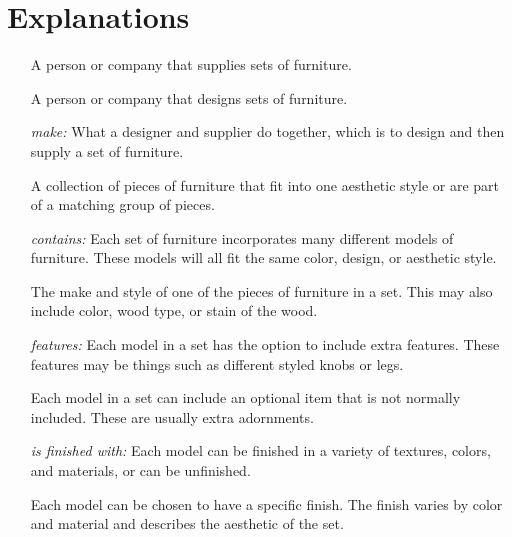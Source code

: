 \documentclass[american,extrafontsizes,12pt,portrait,letterpaper,oneside,onecolumn,final]{memoir}
\begin{document}
\section{Explanations}
\begin{enumerate}[leftmargin=*,widest={\strong{Distribution Center:}}]

\item[\strong{\hypertarget{Supplier}{Supplier}:}]
A person or company that supplies sets of furniture.

\item[\strong{\hypertarget{Designer}{Designer}:}]
A person or company that designs sets of furniture.

\item[\emph{\hypertarget{Supplier-Designer-Set-rel}{make}:}]
What a designer and supplier do together, which is to design and then supply a set of furniture.

\item[\strong{\hypertarget{Set}{Set}:}]
A collection of pieces of furniture that fit into one aesthetic style or are part of a matching group of pieces.

\item[\emph{\hypertarget{Set-Model-rel}{contains}:}]
Each set of furniture incorporates many different models of furniture.
These models will all fit the same color, design, or aesthetic style.

\item[\strong{\hypertarget{Model}{Model}:}]
The make and style of one of the pieces of furniture in a set.
This may also include color, wood type, or stain of the wood.

\item[\emph{\hypertarget{Model-Feature-rel}{features}:}]
Each model in a set has the option to include extra features.
These features may be things such as different styled knobs or legs.

\item[\strong{\hypertarget{Feature}{Feature}:}]
Each model in a set can include an optional item that is not normally included.
These are usually extra adornments.

\item[\emph{\hypertarget{Model-Finish-rel}{is finished with}:}]
Each model can be finished in a variety of textures, colors, and materials, or can be unfinished.

\item[\strong{\hypertarget{Finish}{Finish}:}]
Each model can be chosen to have a specific finish.
The finish varies by color and material and describes the aesthetic of the set.


\end{enumerate}
\end{document}
